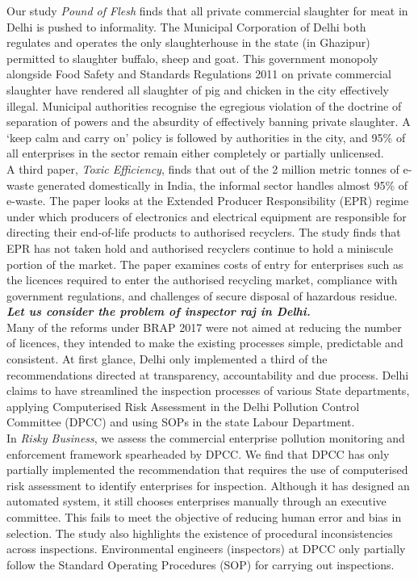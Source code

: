\documentclass[a4paper, 12pt, twoside]{article}
\begin{document}
Our study \textit{Pound of Flesh} finds that all private commercial slaughter for meat in Delhi is pushed to informality. The Municipal Corporation of Delhi both regulates and operates the only slaughterhouse in the state (in Ghazipur) permitted to slaughter buffalo, sheep and goat. This government monopoly alongside Food Safety and Standards Regulations 2011 on private commercial slaughter have rendered all slaughter of pig and chicken in the city effectively illegal. Municipal authorities recognise the egregious violation of the doctrine of separation of powers and the absurdity of effectively banning private slaughter. A ‘keep calm and carry on’ policy is followed by authorities in the city, and 95\% of all enterprises in the sector remain either completely or partially unlicensed.\\

A third paper, \textit{Toxic Efficiency}, finds that out of the 2 million metric tonnes of e-waste generated domestically in India, the informal sector handles almost 95\% of e-waste. The paper looks at the Extended Producer Responsibility (EPR) regime under which producers of electronics and electrical equipment are responsible for directing their end-of-life products to authorised recyclers. The study finds that EPR has not taken hold and authorised recyclers continue to hold a miniscule portion of the market. The paper examines costs of entry for enterprises such as the licences required to enter the authorised recycling market, compliance with government regulations, and challenges of secure disposal of hazardous residue.\\

\textbf{\textit{Let us consider the problem of inspector raj in Delhi.}}\\

Many of the reforms under BRAP 2017 were not aimed at reducing the number of licences, they intended to make the existing processes simple, predictable and consistent. At first glance, Delhi only implemented a third of the recommendations directed at transparency, accountability and due process. Delhi claims to have streamlined the inspection processes of various State departments, applying Computerised Risk Assessment in the Delhi Pollution Control Committee (DPCC) and using SOPs in the state Labour Department. \\
 
In \textit{Risky Business}, we assess the commercial enterprise pollution monitoring and enforcement framework spearheaded by DPCC. We find that DPCC has only partially implemented the recommendation that requires the use of computerised risk assessment to identify enterprises for inspection. Although it has designed an automated system, it still chooses enterprises manually through an executive committee. This fails to meet the objective of reducing human error and bias in selection. The study also highlights the existence of procedural inconsistencies across inspections. Environmental engineers (inspectors) at DPCC only partially follow the Standard Operating Procedures (SOP) for carrying out inspections.\\
 
\end{document}
